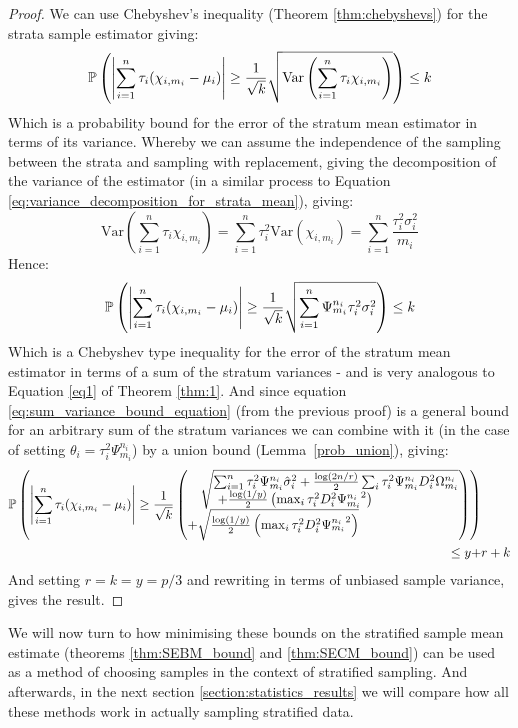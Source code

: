 \begin{proof}
We can use Chebyshev's inequality (Theorem \ref{thm:chebyshevs}) for the strata sample estimator giving:
$$ \operatorname{\mathbb{P}}\left(\left|\sum_{i=1}^n\tau_i(\chi_{i,m_i}-\mu_i)\right|\ge \frac{1}{\sqrt{k}}\sqrt{\text{Var}\left(\sum_{i=1}^n\tau_i\chi_{i,m_i}\right)}\right) \le k $$
Which is a probability bound for the error of the stratum mean estimator in terms of its variance.
Whereby we can assume the independence of the sampling between the strata and sampling with replacement, giving the decomposition of the variance of the estimator (in a similar process to Equation \ref{eq:variance_decomposition_for_strata_mean}), giving:
$$ \text{Var}\left(\sum_{i=1}^n\tau_i\chi_{i,m_i}\right) = \sum_{i=1}^n\tau_i^2\text{Var}(\chi_{i,m_i}) =  \sum_{i=1}^n\frac{\tau_i^2\sigma_i^2}{m_i} $$
Hence:
$$ \operatorname{\mathbb{P}}\left(\left|\sum_{i=1}^n\tau_i(\chi_{i,m_i}-\mu_i)\right|\ge \frac{1}{\sqrt{k}}\sqrt{\sum_{i=1}^n\Psi_{m_i}^{n_i}\tau_i^2\sigma_i^2}\right) \le k $$
Which is a Chebyshev type inequality for the error of the stratum mean estimator in terms of a sum of the stratum variances - and is very analogous to Equation \ref{eq1} of Theorem \ref{thm:1}.
And since equation \ref{eq:sum_variance_bound_equation} (from the previous proof) is a general bound for an arbitrary sum of the stratum variances we can combine with it (in the case of setting $\theta_i = \tau_i^2\Psi_{m_i}^{n_i}$) by a union bound (Lemma~\ref{prob_union}), giving:
\begin{align*}
\pr\left(\left|\sum_{i=1}^n\tau_i(\chi_{i,m_i}-\mu_i)\right| \ge \frac{1}{\sqrt{k}}\left( \begin{matrix*}[l]\quad\sqrt{\begin{matrix*}[l]\sum_{i=1}^n\tau_i^2\Psi_{m_i}^{n_i}\hat{\sigma}_i^2+ \frac{\log(2n/r)}{2}\sum_i\tau_i^2\Psi_{m_i}^{n_i}D_i^2\Omega_{m_i}^{n_i} \\ ~+ \frac{\log(1/y)}{2}\left(\max_i\tau_i^2D_i^2{\Psi_{m_i}^{n_i}}^2\right)\end{matrix*}} \\ +\sqrt{\frac{\log(1/y)}{2}\left(\max_i\tau_i^2D_i^2{\Psi_{m_i}^{n_i}}^2\right)}\end{matrix*}\right)\right)&\\ \le y+&r+k
\end{align*}
And setting $ r=k=y=p/3 $ and rewriting in terms of unbiased sample variance, gives the result.
\end{proof}

We will now turn to how minimising these bounds on the stratified sample mean estimate (theorems \ref{thm:SEBM_bound} and \ref{thm:SECM_bound}) can be used as a method of choosing samples in the context of stratified sampling.
And afterwards, in the next section \ref{section:statistics_results} we will compare how all these methods work in actually sampling stratified data.





